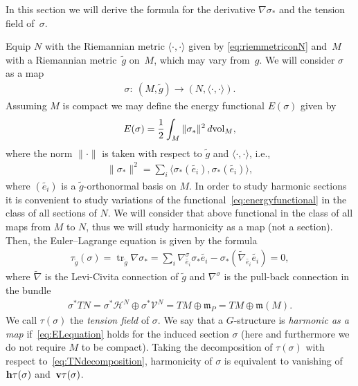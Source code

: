 \documentclass[10pt,a4paper]{amsart}
\numberwithin{equation}{section}
\newcommand{\skal}[2]{\langle #1,#2\rangle}
\begin{document}
In this section we will derive the formula for the derivative $\nabla\sigma_{\ast}$ and the tension f\/ield of~$\sigma$.

Equip $N$ with the Riemannian metric $\skal{\cdot}{\cdot}$ given by \eqref{eq:riemmetriconN} and~$M$ with a Riemannian metric~$\tilde{g}$ on~$M$, which may vary from~$g$. We will consider $\sigma$ as a map
\begin{gather*}
\sigma\colon \ (M,\tilde g)\to (N,\skal{\cdot}{\cdot}).
\end{gather*}
Assuming $M$ is compact we may def\/ine the energy functional $E(\sigma)$ given by
\begin{gather}\label{eq:energyfunctional}
E(\sigma)=\frac{1}{2}\int_M \|\sigma_{\ast}\|^2\,d{\rm vol}_M,
\end{gather}
where the norm $\|\cdot\|$ is taken with respect to $\tilde g$ and $\skal{\cdot}{\cdot}$, i.e.,
\begin{gather*}
\|\sigma_{\ast}\|^2=\sum_i\skal{\sigma_{\ast}(\tilde{e_i})}{\sigma_{\ast}(\tilde{e_i})},
\end{gather*}
where $(\tilde{e_i})$ is a $\tilde{g}$-orthonormal basis on $M$. In order to study harmonic sections it is convenient to study variations of the functional~\eqref{eq:energyfunctional} in the class of all sections of $N$. We will consider that above functional in the class of all maps from $M$ to $N$, thus we will study harmonicity as a map (not a section). Then, the Euler--Lagrange equation is given by the formula
\begin{gather}\label{eq:ELequation}
\tau_{\tilde{g}}(\sigma)=\operatorname{tr}_{\tilde g}\nabla\sigma_{\ast}
=\sum_i\nabla^{\sigma}_{\tilde{e_i}}\sigma_{\ast}\tilde{e_i}
-\sigma_{\ast}(\tilde{\nabla}_{\tilde{e_i}}\tilde{e_i})=0,
\end{gather}
where $\tilde{\nabla}$ is the Levi-Civita connection of $\tilde{g}$ and $\nabla^{\sigma}$ is the pull-back connection in the bundle
\begin{gather}\label{eq:TNdecomposition}
\sigma^{\ast}TN= \sigma^{\ast}\mathcal{H}^N\oplus\sigma^{\ast}\mathcal{V}^N =TM\oplus\mathfrak{m}_P=TM\oplus\mathfrak{m}(M).
\end{gather}
We call $\tau(\sigma)$ the {\it tension field} of $\sigma$. We say that a $G$-structure is {\it harmonic as a map} if~\eqref{eq:ELequation} holds for the induced section $\sigma$ (here and furthermore we do not require $M$ to be compact). Taking the decomposition of $\tau(\sigma)$ with respect to~\eqref{eq:TNdecomposition}, harmonicity of $\sigma$ is equivalent to vanishing of~${\bf h}\tau(\sigma)$ and~${\bf v}\tau(\sigma)$.
\end{document}
